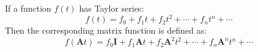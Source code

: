 If a function $f(t)$ has Taylor series:
\[
f(t)=f_0 + f_1t + f_2t^2 + \cdots + f_nt^n + \cdots
\]
Then the corresponding matrix function is defined as:
\[
f(\mathbf{A}t)=f_0\mathbf{I} + f_1\mathbf{A}t + f_2\mathbf{A}^2t^2 + \cdots + f_n\mathbf{A}^nt^n + \cdots
\]

\endinput

